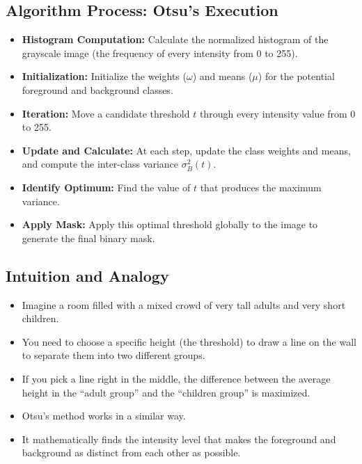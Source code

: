 \documentclass[12pt]{article}
\begin{document}
\subsection{Algorithm Process: Otsu's Execution}
\begin{itemize}
    \item \textbf{Histogram Computation:} Calculate the normalized histogram of the grayscale image (the frequency of every intensity from 0 to 255).

    \item \textbf{Initialization:} Initialize the weights ($\omega$) and means ($\mu$) for the potential foreground and background classes.

    \item \textbf{Iteration:} Move a candidate threshold $t$ through every intensity value from 0 to 255.

    \item \textbf{Update and Calculate:} At each step, update the class weights and means, and compute the inter-class variance $\sigma_B^2(t)$.

    \item \textbf{Identify Optimum:} Find the value of $t$ that produces the maximum variance.

    \item \textbf{Apply Mask:} Apply this optimal threshold globally to the image to generate the final binary mask.
\end{itemize}

\subsection{Intuition and Analogy}
\begin{itemize}
    \item Imagine a room filled with a mixed crowd of very tall adults and very short children.

    \item You need to choose a specific height (the threshold) to draw a line on the wall to separate them into two different groups.

    \item If you pick a line right in the middle, the difference between the average height in the ``adult group'' and the ``children group'' is maximized.

    \item Otsu's method works in a similar way.

    \item It mathematically finds the intensity level that makes the foreground and background as distinct from each other as possible.
\end{itemize}
\end{document}
